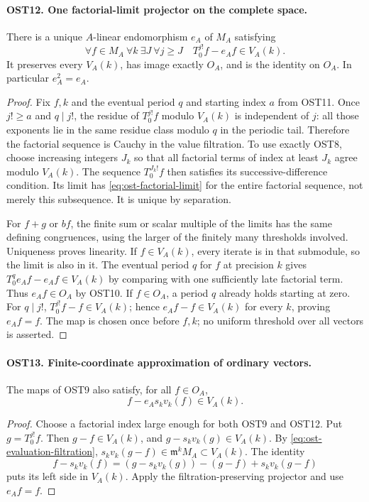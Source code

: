 \documentclass[11pt,a4paper]{article}
\numberwithin{equation}{section}
\theoremstyle{remark}\newtheorem{remark}[theorem]{Remark}
\begin{document}
\paragraph{OST12. One factorial-limit projector on the complete space.}
\label{claim:OST12}
There is a unique $A$-linear endomorphism $e_A$ of $M_A$
satisfying
\begin{equation}\label{eq:ost-factorial-limit}
 \forall f\in M_A\ \forall k\ \exists J\ \forall j\geq J
                 \quad T_0^{j!}f-e_Af\in V_A(k).
\end{equation}
It preserves every $V_A(k)$, has image exactly $O_A$, and
is the identity on $O_A$.  In particular $e_A^2=e_A$.
\begin{proof}
Fix $f,\allowbreak{} k$ and the eventual period $q$ and starting index $a$
from OST11.  Once $j!\geq a$ and $q\mid j!$, the residue
of $T_0^{j!}f$ modulo $V_A(k)$ is independent of $j$:
all those exponents lie in the same residue class modulo $q$
in the periodic tail.  Therefore the factorial sequence is
Cauchy in the value filtration.  To use exactly OST8, choose
increasing integers $J_k$ so that all factorial terms of
index at least $J_k$ agree modulo $V_A(k)$.  The sequence
$T_0^{J_k!}f$ then satisfies its successive-difference
condition.  Its limit has \eqref{eq:ost-factorial-limit}
for the entire factorial sequence, not merely this subsequence.
It is unique by separation.

For $f+g$ or $bf$, the finite sum or scalar multiple of the
limits has the same defining congruences, using the larger
of the finitely many thresholds involved.  Uniqueness proves
linearity.  If $f\in V_A(k)$, every iterate is in that
submodule, so the limit is also in it.  The eventual period
$q$ for $f$ at precision $k$ gives
$T_0^q e_Af-e_Af\in V_A(k)$ by comparing with one sufficiently
late factorial term.  Thus $e_Af\in O_A$ by OST10.
If $f\in O_A$, a period $q$ already holds starting at zero.
For $q\mid j!$, $T_0^{j!}f-f\in V_A(k)$; hence
$e_Af-f\in V_A(k)$ for every $k$, proving $e_Af=f$.
The map is chosen once before $f,\allowbreak{} k$; no uniform threshold
over all vectors is asserted.
\end{proof}

\paragraph{OST13. Finite-coordinate approximation of ordinary vectors.}
\label{claim:OST13}
The maps of OST9 also satisfy, for all $f\in O_A$,
\begin{equation}\label{eq:ost-ordinary-approx}
                   f-e_As_kv_k(f)\in V_A(k).
\end{equation}
\begin{proof}
Choose a factorial index large enough for both OST9 and OST12.
Put $g=T_0^{j!}f$.  Then $g-f\in V_A(k)$, and
$g-s_kv_k(g)\in V_A(k)$.  By
\eqref{eq:ost-evaluation-filtration},
$s_kv_k(g-f)\in\mathfrak m^kM_A\subset V_A(k)$.
The identity
\[
 f-s_kv_k(f)=(g-s_kv_k(g))-(g-f)+s_kv_k(g-f)
\]
puts its left side in $V_A(k)$.  Apply the filtration-preserving
projector and use $e_Af=f$.
\end{proof}
\end{document}
